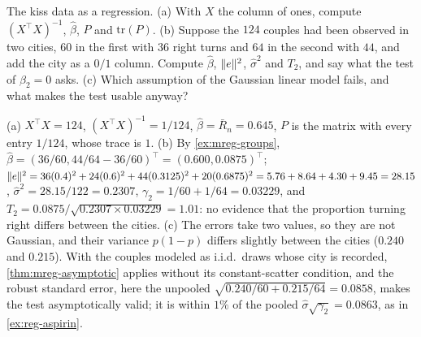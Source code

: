 \begin{exercise}
\label{ex:mreg-kiss}
The kiss data as a regression. (a) With $X$ the column of ones, compute $(X^\top X)^{-1}$, $\hat{\beta}$, $P$ and $\mathrm{tr}(P)$. (b) Suppose the $124$ couples had been observed in two cities, $60$ in the first with $36$ right turns and $64$ in the second with $44$, and add the city as a $0/1$ column. Compute $\hat{\beta}$, $\lVert e\rVert^2$, $\hat{\sigma}^2$ and $T_2$, and say what the test of $\beta_2 = 0$ asks. (c) Which assumption of the Gaussian linear model fails, and what makes the test usable anyway?
\end{exercise}
\begin{solution}
(a) $X^\top X = 124$, $(X^\top X)^{-1} = 1/124$, $\hat{\beta} = \bar{R}_n = 0.645$, $P$ is the matrix with every entry $1/124$, whose trace is $1$. (b) By \cref{ex:mreg-groups}, $\hat{\beta} = (36/60, 44/64 - 36/60)^\top = (0.600, 0.0875)^\top$; $\lVert e\rVert^2 = 36(0.4)^2 + 24(0.6)^2 + 44(0.3125)^2 + 20(0.6875)^2 = 5.76 + 8.64 + 4.30 + 9.45 = 28.15$, $\hat{\sigma}^2 = 28.15/122 = 0.2307$, $\gamma_2 = 1/60 + 1/64 = 0.03229$, and $T_2 = 0.0875/\sqrt{0.2307 \times 0.03229} = 1.01$: no evidence that the proportion turning right differs between the cities. (c) The errors take two values, so they are not Gaussian, and their variance $p(1 - p)$ differs slightly between the cities ($0.240$ and $0.215$). With the couples modeled as i.i.d.\ draws whose city is recorded, \cref{thm:mreg-asymptotic} applies without its constant-scatter condition, and the robust standard error, here the unpooled $\sqrt{0.240/60 + 0.215/64} = 0.0858$, makes the test asymptotically valid; it is within $1\%$ of the pooled $\hat{\sigma}\sqrt{\gamma_2} = 0.0863$, as in \cref{ex:reg-aspirin}.
\end{solution}
